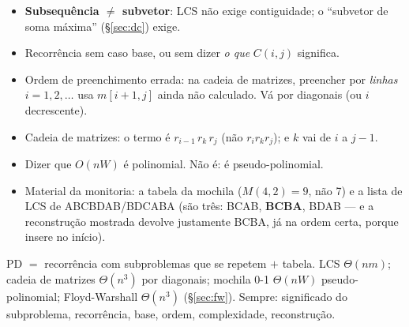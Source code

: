 \begin{cuidado}[Armadilhas de PD]
\begin{itemize}
  \item \textbf{Subsequência $\ne$ subvetor}: LCS não exige contiguidade; o ``subvetor de soma máxima'' (§\ref{sec:dc}) exige.
  \item Recorrência sem caso base, ou sem dizer \emph{o que} $C(i,j)$ significa.
  \item Ordem de preenchimento errada: na cadeia de matrizes, preencher por \emph{linhas} $i=1,2,\dots$ usa $m[i+1,j]$ ainda não calculado. Vá por diagonais (ou $i$ decrescente).
  \item Cadeia de matrizes: o termo é $r_{i-1}\,r_k\,r_j$ (não $r_i r_k r_j$); e $k$ vai de $i$ a $j-1$.
  \item Dizer que $O(nW)$ é polinomial. Não é: é pseudo-polinomial.
  \item Material da monitoria: a tabela da mochila ($M(4,2)=9$, não 7) e a lista de LCS de ABCBDAB/BDCABA (são três: BCAB, \textbf{BCBA}, BDAB --- e a reconstrução mostrada devolve justamente BCBA, já na ordem certa, porque insere no início).
\end{itemize}
\end{cuidado}

\begin{chave}
PD $=$ recorrência com subproblemas que se repetem $+$ tabela. LCS $\Theta(nm)$; cadeia de matrizes $\Theta(n^3)$ por diagonais; mochila 0-1 $\Theta(nW)$ pseudo-polinomial; Floyd-Warshall $\Theta(n^3)$ (§\ref{sec:fw}). Sempre: significado do subproblema, recorrência, base, ordem, complexidade, reconstrução.
\end{chave}
